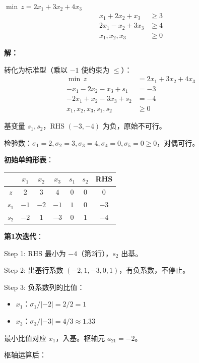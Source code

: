 \begin{example}[对偶单纯形法]
$\min \, z = 2x_1 + 3x_2 + 4x_3$
\begin{align*}
x_1 + 2x_2 + x_3 &\geq 3 \\
2x_1 - x_2 + 3x_3 &\geq 4 \\
x_1, x_2, x_3 &\geq 0
\end{align*}

\textbf{解：}

转化为标准型（乘以 $-1$ 使约束为 $\leq$）：
\begin{align*}
\min \, z &= 2x_1 + 3x_2 + 4x_3 \\
-x_1 - 2x_2 - x_3 + s_1 &= -3 \\
-2x_1 + x_2 - 3x_3 + s_2 &= -4 \\
x_1, x_2, x_3, s_1, s_2 &\geq 0
\end{align*}

基变量 $s_1, s_2$，RHS $(-3, -4)$ 为负，原始不可行。

检验数：$\sigma_1 = 2, \sigma_2 = 3, \sigma_3 = 4, \sigma_4 = 0, \sigma_5 = 0 \geq 0$，对偶可行。

\textbf{初始单纯形表}：

\begin{table}[H]
\centering
\begin{tabular}{@{}c|ccccc|c@{}}
\toprule
& $x_1$ & $x_2$ & $x_3$ & $s_1$ & $s_2$ & RHS \\
\midrule
$z$ & $2$ & $3$ & $4$ & $0$ & $0$ & $0$ \\
\midrule
$s_1$ & $-1$ & $-2$ & $-1$ & $1$ & $0$ & $-3$ \\
$s_2$ & $-2$ & $1$ & $-3$ & $0$ & $1$ & $-4$ \\
\bottomrule
\end{tabular}
\end{table}

\textbf{第1次迭代}：

Step 1: RHS 最小为 $-4$（第2行），$s_2$ 出基。

Step 2: 出基行系数 $(-2, 1, -3, 0, 1)$，有负系数，不停止。

Step 3: 负系数列的比值：
\begin{itemize}
    \item $x_1$：$\sigma_1/|{-2}| = 2/2 = 1$
    \item $x_3$：$\sigma_3/|{-3}| = 4/3 \approx 1.33$
\end{itemize}

最小比值对应 $x_1$，入基。枢轴元 $a_{21} = -2$。

枢轴运算后：


\end{example}
